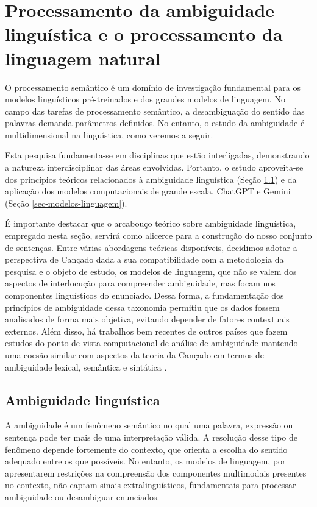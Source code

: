 \section{Processamento da ambiguidade linguística e o processamento da linguagem natural}\label{sec-referencial-teorico}

O processamento semântico é um domínio de investigação fundamental para os modelos linguísticos pré-treinados e dos grandes modelos de linguagem. No campo das tarefas de processamento semântico, a desambiguação do sentido das palavras demanda parâmetros definidos. No entanto, o estudo da ambiguidade é multidimensional na linguística, como veremos a seguir.

Esta pesquisa fundamenta-se em disciplinas que estão interligadas, demonstrando a natureza interdisciplinar das áreas envolvidas. Portanto, o estudo aproveita-se dos princípios teóricos relacionados à ambiguidade linguística (Seção \ref{sec-ambiguidade-linguistica}) e da aplicação dos modelos computacionais de grande escala, ChatGPT e Gemini (Seção \ref{sec-modelos-linguagem}).


É importante destacar que o arcabouço teórico sobre ambiguidade linguística, empregado nesta seção, servirá como alicerce para a construção do nosso conjunto de sentenças. Entre várias abordagens teóricas disponíveis, decidimos adotar a perspectiva de Cançado \cite{canccado2005manual} dada a sua compatibilidade com a metodologia da pesquisa e o objeto de estudo, os modelos de linguagem, que não se valem dos aspectos de interlocução para compreender ambiguidade, mas focam nos componentes linguísticos do enunciado. Dessa forma, a fundamentação dos princípios de ambiguidade dessa taxonomia permitiu que os dados fossem analisados de forma mais objetiva, evitando depender de fatores contextuais externos. Além disso, há trabalhos bem recentes de outros países que fazem estudos do ponto de vista computacional de análise de ambiguidade mantendo uma coesão similar com aspectos da teoria da Cançado em termos de ambiguidade lexical, semântica e sintática \cite{haber2021patterns,ortega2023linguistic,liu2023we,goel2023beyond}.



\subsection{Ambiguidade linguística}\label{sec-ambiguidade-linguistica}


A ambiguidade é um fenômeno semântico no qual uma palavra, expressão ou sentença pode ter mais de uma interpretação válida. A resolução desse tipo de fenômeno depende fortemente do contexto, que orienta a escolha do sentido adequado entre os que possíveis. No entanto, os modelos de linguagem, por apresentarem restrições na compreensão dos componentes multimodais presentes no contexto, não captam sinais extralinguísticos, fundamentais para processar ambiguidade ou desambiguar enunciados.

